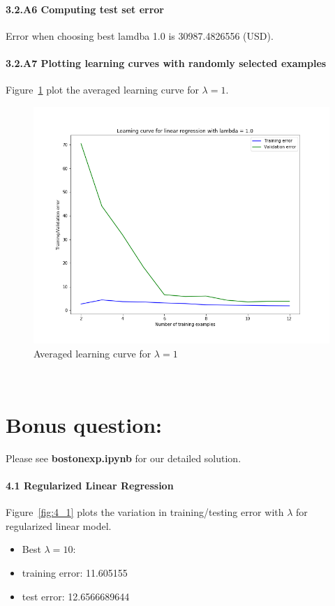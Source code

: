 \documentclass[english,11pt]{article}
\begin{document}
\subsection*{3.2.A6 Computing test set error}
Error when choosing best lamdba  1.0  is  30987.4826556 (USD).

\subsection*{3.2.A7 Plotting learning curves with randomly selected examples}
Figure~\ref{fig:3_2_A7} plot the averaged learning curve for $\lambda = 1$.

\begin{figure}[h]
\centering
\includegraphics[width=.6\textwidth]{../hw1/part2/fig3_2_A7.png}
\caption{Averaged learning curve for $\lambda = 1$}
\label{fig:3_2_A7}
\end{figure}

\
\part*{Bonus question:}
Please see  \textbf{bostonexp.ipynb} for our detailed solution.
\subsection*{ 4.1 Regularized Linear Regression}
Figure~\ref{fig:4_1}  plots the variation in training/testing error with $\lambda$ for regularized linear model.
\begin{itemize}
\item Best $\lambda=10$:
\item training error: 11.605155
\item test error: 12.6566689644
\end{itemize}
\end{document}
